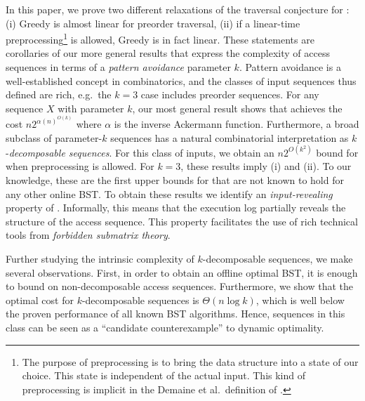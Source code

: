 In this paper, we prove two different relaxations of the traversal conjecture for \greedy: (i) {\sc Greedy} is almost linear for preorder traversal, %
(ii) if a linear-time preprocessing\footnote{The purpose of preprocessing is to bring the data structure into a state of our choice. This state is independent
of the actual input. This kind of preprocessing is implicit in the Demaine et al.\ definition of \greedy.} is allowed, {\sc Greedy} is in fact linear.
These statements are corollaries of our more general results that express the complexity of access sequences in terms of a {\em pattern avoidance} parameter $k$. 
Pattern avoidance is a well-established concept in combinatorics, and the classes of input sequences thus defined are rich, e.g.\ the $k=3$ case includes preorder sequences. For any sequence $X$ with parameter $k$, our most general result shows that \greedy achieves the cost $n 2^{\alpha(n)^{O(k)}}$ where $\alpha$ is the inverse Ackermann function. 
Furthermore, a broad subclass of parameter-$k$ sequences has a natural combinatorial interpretation as $k$-{\em decomposable sequences}. For this class of inputs, we obtain an $n 2^{O(k^2)}$ bound for \greedy when preprocessing is allowed. 
For $k=3$, these results imply (i) and (ii). 
To our knowledge, these are the first upper bounds for \greedy that are not known to hold for any other online BST.
To obtain these results we identify an {\em input-revealing} property of \greedy. Informally, this means that the execution log partially reveals the structure of the access sequence. This property facilitates the use of rich technical tools from {\em forbidden submatrix theory}.

Further studying the intrinsic complexity of $k$-decomposable sequences, we make several observations. 
First, in order to obtain an offline optimal BST, it is enough to bound \greedy on non-decomposable access sequences. 
Furthermore, we show that the optimal cost for $k$-decomposable sequences is $\Theta(n \log k)$, which is well below the proven performance of all known BST algorithms. Hence, sequences in this class can be seen as a ``candidate counterexample'' to dynamic optimality.



